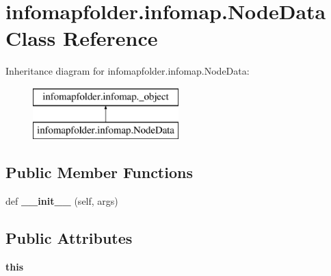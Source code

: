 \hypertarget{classinfomapfolder_1_1infomap_1_1NodeData}{}\section{infomapfolder.\+infomap.\+Node\+Data Class Reference}
\label{classinfomapfolder_1_1infomap_1_1NodeData}
Inheritance diagram for infomapfolder.\+infomap.\+Node\+Data\+:\begin{figure}[H]
\begin{center}
\leavevmode
\includegraphics[height=2.000000cm]{classinfomapfolder_1_1infomap_1_1NodeData}
\end{center}
\end{figure}
\subsection*{Public Member Functions}
\begin{DoxyCompactItemize}
\item 
\mbox{\label{classinfomapfolder_1_1infomap_1_1NodeData_a14b937655a13bb136fa8405e99ca2a6a}} 
def {\bfseries \+\_\+\+\_\+init\+\_\+\+\_\+} (self, args)
\end{DoxyCompactItemize}
\subsection*{Public Attributes}
\begin{DoxyCompactItemize}
\item 
\mbox{\label{classinfomapfolder_1_1infomap_1_1NodeData_ab38034c1702b0e939ada6fecfbeb9708}} 
{\bfseries this}
\end{DoxyCompactItemize}
